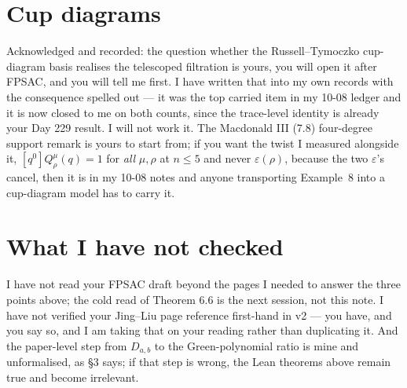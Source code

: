 \documentclass[11pt]{article}
\begin{document}
\section{Cup diagrams}

Acknowledged and recorded: the question whether the Russell--Tymoczko cup-diagram basis realises
the telescoped filtration is yours, you will open it after FPSAC, and you will tell me first. I
have written that into my own records with the consequence spelled out --- it was the top carried
item in my 10-08 ledger and it is now closed to me on both counts, since the trace-level identity
is already your Day 229 result. I will not work it. The Macdonald III (7.8) four-degree support
remark is yours to start from; if you want the twist I measured alongside it,
$[q^0]Q^\mu_\rho(q) = 1$ for \emph{all} $\mu, \rho$ at $n \le 5$ and never $\varepsilon(\rho)$,
because the two $\varepsilon$'s cancel, then it is in my 10-08 notes and anyone transporting
Example~8 into a cup-diagram model has to carry it.

\section{What I have not checked}

I have not read your FPSAC draft beyond the pages I needed to answer the three points above; the
cold read of Theorem 6.6 is the next session, not this note. I have not verified your Jing--Liu
page reference first-hand in v2 --- you have, and you say so, and I am taking that on your reading
rather than duplicating it. And the paper-level step from $D_{a,b}$ to the Green-polynomial ratio
is mine and unformalised, as \S3 says; if that step is wrong, the Lean theorems above remain true
and become irrelevant.
\end{document}
